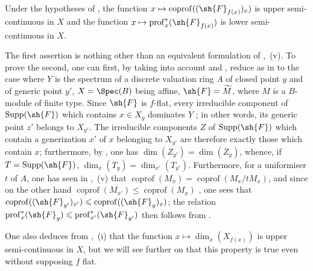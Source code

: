 \begin{corollary}[12.1.3]
\label{IV.12.1.3}
Under the hypotheses of , the function $x\mapsto\operatorname{coprof}((\sh{F}_{f(x)})_x)$ is upper semi-continuous in $X$ and the function $x\mapsto\operatorname{prof}_x^*(\sh{F}_{f(x)})$  is lower semi-continuous in $X$.
\end{corollary}

The first assertion is nothing other than an equivalent formulation of ,~(v).
To prove the second, one can first, by taking into account  and , reduce as in  to the case where $Y$ is the spectrum of a discrete valuation ring $A$ of closed point $y$ and of generic point $y'$, $X=\Spec(B)$ being affine, $\sh{F}=\widetilde{M}$, where $M$ is a $B$-module of finite type.
Since $\sh{F}$ is $f$-flat, every irreducible component of $\operatorname{Supp}(\sh{F})$ which contains $x\in X_y$ dominates $Y$ ; in other words, its generic point $z'$ belongs to $X_{y'}$. The irreducible components $Z$ of $\operatorname{Supp}(\sh{F})$ which contain a generization $x'$ of $x$ belonging to $X_{y'}$ are therefore exactly those which contain $x$; furthermore, by , one has $\dim(Z_{y'})=\dim(Z_y)$, whence, if $T=\operatorname{Supp}(\sh{F})$, $\dim_x(T_y)=\dim_{x'}(T_{y'})$.
Furthermore, for a uniformiser $t$ of $A$, one has seen in ,~(v) that $\operatorname{coprof}(M_x)=\operatorname{coprof}(M_x/tM_x)$, and since on the other hand $\operatorname{coprof}(M_{x'})\leqslant\operatorname{coprof}(M_x)$ , one sees that $\operatorname{coprof}((\sh{F}_{y'})_{x'})\leqslant\operatorname{coprof}((\sh{F}_y)_x)$; the relation $\operatorname{prof}_x^*(\sh{F}_y)\leqslant\operatorname{prof}_{x'}^*(\sh{F}_{y'})$ then follows from .

\begin{remark}[12.1.4]
\label{IV.12.1.4}
One also deduces from ,~(i) that the function $x\mapsto\dim_x(X_{f(x)})$ is upper semi-continuous in $X$, but we will see further on  that this property is true even without supposing $f$ flat.
\end{remark}

